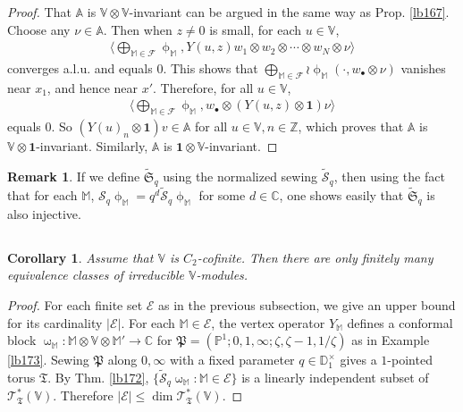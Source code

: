\documentclass[11pt,b5paper,notitlepage]{article}
\theoremstyle{definition}
\newtheorem{rem}[df]{Remark}
\theoremstyle{plain}
\newtheorem{co}[df]{Corollary}
\newcommand{\fk}{\mathfrak}
\newcommand{\mc}{\mathcal}
\newcommand{\wtd}{\widetilde}
\newcommand{\id}{\mathbf{1}}
\newcommand{\bigbk}[1]{\big\langle {#1}\big\rangle}
\newcommand{\scr}{\mathscr}
\newcommand{\blt}{\bullet}
\newcommand{\Vbb}{\mathbb V}
\newcommand{\Abb}{\mathbb A}
\newcommand{\Mbb}{\mathbb M}
\newcommand{\Cbb}{\mathbb C}
\newcommand{\Zbb}{\mathbb Z}
\newcommand{\Pbb}{\mathbb P}
\newcommand{\Dbb}{\mathbb D}
\numberwithin{equation}{section}
\begin{document}
\begin{proof}
That $\Abb$ is $\Vbb\otimes\Vbb$-invariant can be argued in the same way as Prop. \ref{lb167}. Choose any $\nu\in\Abb$. Then when $z\neq 0$ is small, for each $u\in\Vbb$,
\begin{align}
\bigbk{\bigoplus_{\Mbb\in\mc F}\upphi_\Mbb,Y(u,z)w_1\otimes w_2\otimes\cdots\otimes w_N\otimes\nu}
\end{align}
converges a.l.u. and equals $0$. This shows that $\bigoplus_{\Mbb\in\mc F}\wr\upphi_\Mbb(\cdot,w_\blt\otimes\nu)$ vanishes near $x_1$, and hence near $x'$. Therefore, for all $u\in\Vbb$,
\begin{align*}
\bigbk{\bigoplus_{\Mbb\in\mc F}\upphi_\Mbb,w_\blt\otimes(Y(u,z)\otimes \id)\nu}
\end{align*}
equals $0$. So $(Y(u)_n\otimes\id)v\in\Abb$ for all $u\in\Vbb,n\in\Zbb$, which proves that $\Abb$ is $\Vbb\otimes\id$-invariant. Similarly, $\Abb$ is $\id\otimes\Vbb$-invariant.
\end{proof}

\begin{rem}
If we define $\wtd{\fk S}_q$ using the normalized sewing $\wtd{\mc S}_q$,  then using the fact that for each $\Mbb$, $\mc S_q\upphi_\Mbb=q^d\wtd{\mc S}_q\upphi_\Mbb$ for some $d\in\Cbb$, one shows easily that $\wtd{\fk S}_q$ is also injective.
\end{rem}


\subsection{}


\begin{co}\label{lb174}
Assume that $\Vbb$ is $C_2$-cofinite. Then there are only finitely many equivalence classes of irreducible $\Vbb$-modules.
\end{co}


\begin{proof}
For each finite set $\mc E$  as in the previous subsection, we give an upper bound for its cardinality $|\mc E|$. For each $\Mbb\in\mc E$, the vertex operator $Y_\Mbb$ defines a conformal block $\upomega_\Mbb:\Mbb\otimes\Vbb\otimes\Mbb'\rightarrow\Cbb$ for $\fk P=(\Pbb^1;0,1,\infty;\zeta,\zeta-1,1/\zeta)$ as in Example \ref{lb173}. Sewing $\fk P$ along $0,\infty$ with a fixed parameter $q\in\Dbb_1^\times$ gives a $1$-pointed torus $\fk T$. By Thm. \ref{lb172}, $\{\wtd{\mc S}_q\upomega_\Mbb:\Mbb\in\mc E\}$ is a linearly independent subset of $\scr T_{\fk T}^*(\Vbb)$. Therefore $|\mc E|\leq \dim\scr T_{\fk T}^*(\Vbb)$.
\end{proof}
\end{document}
